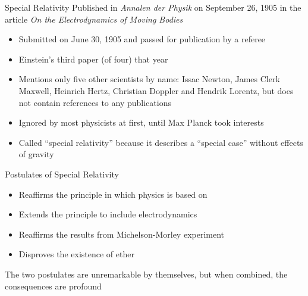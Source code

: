 \documentclass[12pt,compress,aspectratio=169]{beamer}
\begin{document}
\begin{frame}{Special Relativity}
  Published in \emph{Annalen der Physik} on September 26, 1905 in the article
  \emph{On the Electrodynamics of Moving Bodies}
  \begin{itemize}
  \item Submitted on June 30, 1905 and passed for publication by a referee
  \item Einstein's third paper (of four) that year
  \item Mentions only five other scientists by name: Issac Newton, James
    Clerk Maxwell, Heinrich Hertz, Christian Doppler and Hendrik Lorentz, but
    does not contain references to any publications
  \item Ignored by most physicists at first, until Max Planck took interests
  \item Called ``special relativity'' because it describes a ``special case''
    without effects of gravity
  \end{itemize}
\end{frame}



\begin{frame}{Postulates of Special Relativity}
  \begin{center}
  \end{center}
  \begin{itemize}
  \item Reaffirms the principle in which physics is based on
  \item Extends the principle to include electrodynamics%
  \end{itemize}

  \vspace{.1in}
  \begin{center}
  \end{center}
  \begin{itemize}
  \item Reaffirms the results from Michelson-Morley experiment
  \item Disproves the existence of ether
  \end{itemize}
  \vspace{.1in}The two postulates are unremarkable by themselves, but when
  combined, the consequences are profound
\end{frame}
\end{document}
